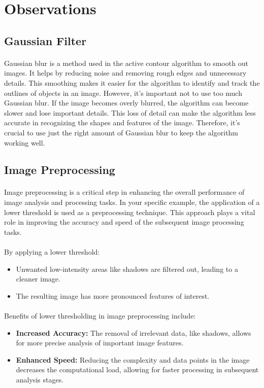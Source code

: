 \documentclass[12pt,a4paper]{report}
\begin{document}
\clearpage
\section{Observations}
\subsection{Gaussian Filter}
\paragraph*{}
Gaussian blur is a method used in the active contour algorithm to smooth out images. It helps by reducing noise and removing rough edges and unnecessary details. This smoothing makes it easier for the algorithm to identify and track the outlines of objects in an image. However, it's important not to use too much Gaussian blur. If the image becomes overly blurred, the algorithm can become slower and lose important details. This loss of detail can make the algorithm less accurate in recognizing the shapes and features of the image. Therefore, it's crucial to use just the right amount of Gaussian blur to keep the algorithm working well.

\subsection{Image Preprocessing}
\paragraph*{}
Image preprocessing is a critical step in enhancing the overall performance of image analysis and processing tasks. In your specific example, the application of a lower threshold is used as a preprocessing technique. This approach plays a vital role in improving the accuracy and speed of the subsequent image processing tasks.
\paragraph*{}
By applying a lower threshold:
\begin{itemize}
    \item Unwanted low-intensity areas like shadows are filtered out, leading to a cleaner image.
    \item The resulting image has more pronounced features of interest.
\end{itemize}
\paragraph*{}
Benefits of lower thresholding in image preprocessing include:
\begin{itemize}
    \item \textbf{Increased Accuracy:} The removal of irrelevant data, like shadows, allows for more precise analysis of important image features.
    \item \textbf{Enhanced Speed:} Reducing the complexity and data points in the image decreases the computational load, allowing for faster processing in subsequent analysis stages.
\end{itemize}
\end{document}
